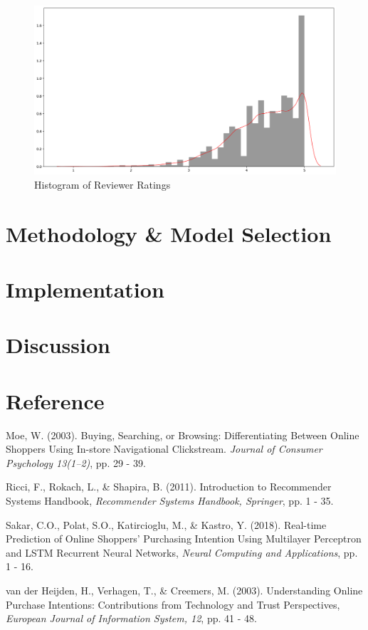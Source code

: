 \documentclass[final, 3p,12pt,times,letter,twocolumn]{elsarticle}
\begin{document}
\begin{figure}[h]
\centering
\caption{Histogram of Reviewer Ratings}
\includegraphics[width=1\linewidth]{meanstar_hist}
\end{figure}


\section{Methodology \& Model Selection}

\section{Implementation}

\section{Discussion}

\section*{Reference}

\begin{thebibliography}{0}\setlength{\itemsep}{4mm}

\bibitem{}Moe, W. (2003). Buying, Searching, or Browsing: Differentiating Between Online Shoppers Using In-store Navigational Clickstream. \textit{Journal of Consumer Psychology 13(1–2)}, pp. 29 - 39.

\bibitem{}Ricci, F., Rokach, L., \& Shapira, B. (2011). Introduction to Recommender Systems Handbook, \textit{Recommender Systems Handbook, Springer}, pp. 1 - 35.

\bibitem{}Sakar, C.O., Polat, S.O., Katircioglu, M., \& Kastro, Y. (2018). Real-time Prediction of Online Shoppers’ Purchasing Intention Using Multilayer Perceptron and LSTM Recurrent Neural Networks, \textit{Neural Computing and Applications}, pp. 1 - 16.

\bibitem{}van der Heijden, H., Verhagen, T., \& Creemers, M. (2003). Understanding Online Purchase Intentions: Contributions from Technology and Trust Perspectives, \textit{European Journal of Information System, 12}, pp. 41 - 48.

\end{thebibliography}
\end{document}
